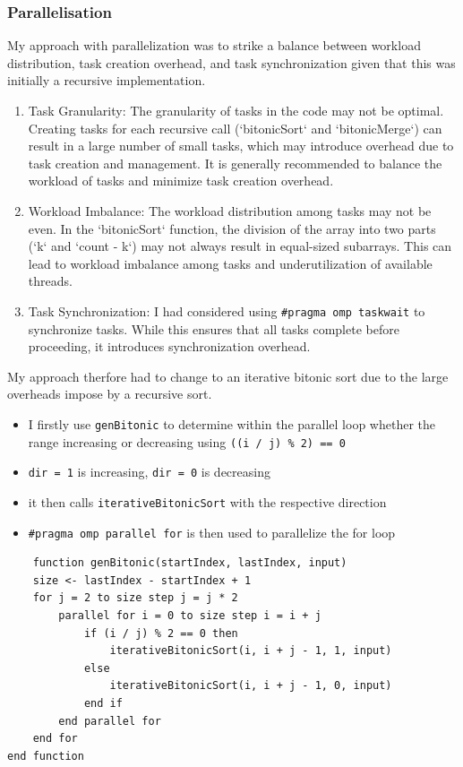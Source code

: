 \subsubsection*{Parallelisation} 
My approach with parallelization was to strike a balance between workload distribution, task creation overhead, and task synchronization 
given that this was initially a recursive implementation.
\begin{enumerate}
	\item Task Granularity: The granularity of tasks in the code may not be optimal. Creating tasks for each recursive call (`bitonicSort` and `bitonicMerge`) can result in a large number of small tasks, which may introduce overhead due to task creation and management. It is generally recommended to balance the workload of tasks and minimize task creation overhead.
	\item Workload Imbalance: The workload distribution among tasks may not be even. In the `bitonicSort` function, the division of the array into two parts (`k` and `count - k`) may not always result in equal-sized subarrays. This can lead to workload imbalance among tasks and underutilization of available threads.
	\item Task Synchronization: I had considered using \texttt{\#pragma omp taskwait} to synchronize tasks. While this ensures that all tasks complete before proceeding, it introduces synchronization overhead. 
\end{enumerate}
My approach therfore had to change to an iterative bitonic sort due to the large overheads impose
by a recursive sort.
\begin{itemize}
	\item I firstly use \texttt{genBitonic} to determine within the parallel loop whether the range increasing or decreasing using \texttt{((i / j) \% 2) == 0}
	\item \texttt{dir = 1} is increasing, \texttt{dir = 0} is decreasing
	\item it then calls \texttt{iterativeBitonicSort} with the respective direction
	\item \texttt{\#pragma omp parallel for} is then used to parallelize the for loop
\end{itemize}
\begin{verbatim}
	function genBitonic(startIndex, lastIndex, input)
    size <- lastIndex - startIndex + 1
    for j = 2 to size step j = j * 2
        parallel for i = 0 to size step i = i + j
            if (i / j) % 2 == 0 then
                iterativeBitonicSort(i, i + j - 1, 1, input)
            else
                iterativeBitonicSort(i, i + j - 1, 0, input)
            end if
        end parallel for
    end for
end function

	\end{verbatim}
